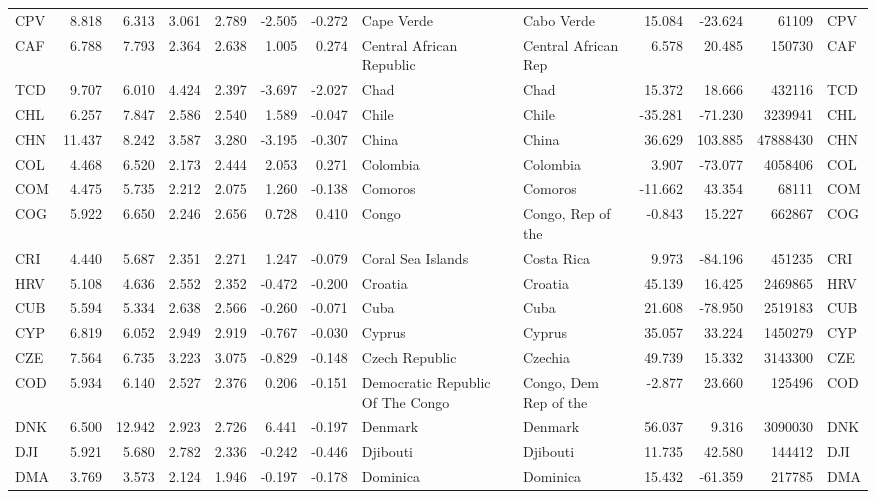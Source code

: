 \begin{tabular}{lrrrrrrllrrrl}
CPV & 8.818 & 6.313 & 3.061 & 2.789 & -2.505 & -0.272 & Cape Verde & Cabo Verde & 15.084 & -23.624 & 61109 & CPV \\
CAF & 6.788 & 7.793 & 2.364 & 2.638 & 1.005 & 0.274 & Central African Republic & Central African Rep & 6.578 & 20.485 & 150730 & CAF \\
TCD & 9.707 & 6.010 & 4.424 & 2.397 & -3.697 & -2.027 & Chad & Chad & 15.372 & 18.666 & 432116 & TCD \\
CHL & 6.257 & 7.847 & 2.586 & 2.540 & 1.589 & -0.047 & Chile & Chile & -35.281 & -71.230 & 3239941 & CHL \\
CHN & 11.437 & 8.242 & 3.587 & 3.280 & -3.195 & -0.307 & China & China & 36.629 & 103.885 & 47888430 & CHN \\
COL & 4.468 & 6.520 & 2.173 & 2.444 & 2.053 & 0.271 & Colombia & Colombia & 3.907 & -73.077 & 4058406 & COL \\
COM & 4.475 & 5.735 & 2.212 & 2.075 & 1.260 & -0.138 & Comoros & Comoros & -11.662 & 43.354 & 68111 & COM \\
COG & 5.922 & 6.650 & 2.246 & 2.656 & 0.728 & 0.410 & Congo & Congo, Rep of the & -0.843 & 15.227 & 662867 & COG \\
CRI & 4.440 & 5.687 & 2.351 & 2.271 & 1.247 & -0.079 & Coral Sea Islands & Costa Rica & 9.973 & -84.196 & 451235 & CRI \\
HRV & 5.108 & 4.636 & 2.552 & 2.352 & -0.472 & -0.200 & Croatia & Croatia & 45.139 & 16.425 & 2469865 & HRV \\
CUB & 5.594 & 5.334 & 2.638 & 2.566 & -0.260 & -0.071 & Cuba & Cuba & 21.608 & -78.950 & 2519183 & CUB \\
CYP & 6.819 & 6.052 & 2.949 & 2.919 & -0.767 & -0.030 & Cyprus & Cyprus & 35.057 & 33.224 & 1450279 & CYP \\
CZE & 7.564 & 6.735 & 3.223 & 3.075 & -0.829 & -0.148 & Czech Republic & Czechia & 49.739 & 15.332 & 3143300 & CZE \\
COD & 5.934 & 6.140 & 2.527 & 2.376 & 0.206 & -0.151 & Democratic Republic Of The Congo & Congo, Dem Rep of the & -2.877 & 23.660 & 125496 & COD \\
DNK & 6.500 & 12.942 & 2.923 & 2.726 & 6.441 & -0.197 & Denmark & Denmark & 56.037 & 9.316 & 3090030 & DNK \\
DJI & 5.921 & 5.680 & 2.782 & 2.336 & -0.242 & -0.446 & Djibouti & Djibouti & 11.735 & 42.580 & 144412 & DJI \\
DMA & 3.769 & 3.573 & 2.124 & 1.946 & -0.197 & -0.178 & Dominica & Dominica & 15.432 & -61.359 & 217785 & DMA \\

\end{tabular}
